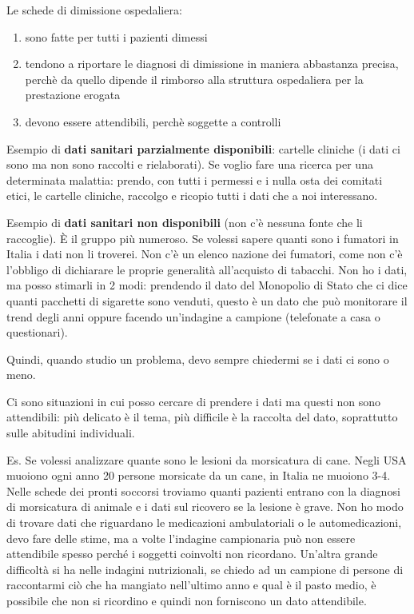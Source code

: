 Le schede di dimissione ospedaliera:

\begin{enumerate}
\def\labelenumi{\alph{enumi})}
\item
  sono fatte per tutti i pazienti dimessi
\item
  tendono a riportare le diagnosi di dimissione in maniera abbastanza
  precisa, perchè da quello dipende il rimborso alla struttura
  ospedaliera per la prestazione erogata
\item
  devono essere attendibili, perchè soggette a controlli
\end{enumerate}

Esempio di \textbf{dati sanitari parzialmente disponibili}: cartelle
cliniche (i dati ci sono ma non sono raccolti e rielaborati). Se voglio
fare una ricerca per una determinata malattia: prendo, con tutti i
permessi e i nulla osta dei comitati etici, le cartelle cliniche,
raccolgo e ricopio tutti i dati che a noi interessano.

Esempio di \textbf{dati sanitari non disponibili} (non c'è nessuna fonte
che li raccoglie). È il gruppo più numeroso. Se volessi sapere quanti
sono i fumatori in Italia i dati non li troverei. Non c'è un elenco
nazione dei fumatori, come non c'è l'obbligo di dichiarare le proprie
generalità all'acquisto di tabacchi. Non ho i dati, ma posso stimarli in
2 modi: prendendo il dato del Monopolio di Stato che ci dice quanti
pacchetti di sigarette sono venduti, questo è un dato che può monitorare
il trend degli anni oppure facendo un'indagine a campione (telefonate a
casa o questionari).

Quindi, quando studio un problema, devo sempre chiedermi se i dati ci
sono o meno.

Ci sono situazioni in cui posso cercare di prendere i dati ma questi non
sono attendibili: più delicato è il tema, più difficile è la raccolta
del dato, soprattutto sulle abitudini individuali.

Es. Se volessi analizzare quante sono le lesioni da morsicatura di cane.
Negli USA muoiono ogni anno 20 persone morsicate da un cane, in Italia
ne muoiono 3-4. Nelle schede dei pronti soccorsi troviamo quanti
pazienti entrano con la diagnosi di morsicatura di animale e i dati sul
ricovero se la lesione è grave. Non ho modo di trovare dati che
riguardano le medicazioni ambulatoriali o le automedicazioni, devo fare
delle stime, ma a volte l'indagine campionaria può non essere
attendibile spesso perché i soggetti coinvolti non ricordano. Un'altra
grande difficoltà si ha nelle indagini nutrizionali, se chiedo ad un
campione di persone di raccontarmi ciò che ha mangiato nell'ultimo anno
e qual è il pasto medio, è possibile che non si ricordino e quindi non
forniscono un dato attendibile.

